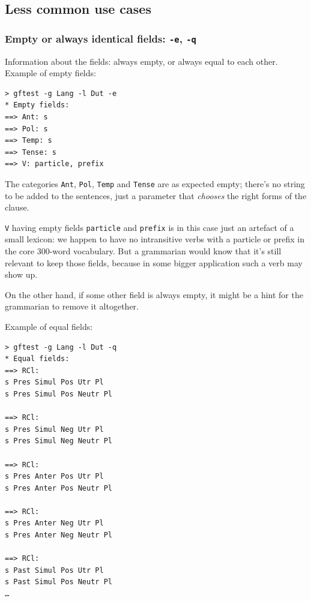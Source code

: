 \hypertarget{less-common-use-cases}{%
\subsection{Less common use cases}\label{less-common-use-cases}}

\hypertarget{empty-or-always-identical-fields--e--q}{%
\subsubsection{\texorpdfstring{Empty or always identical fields:
\texttt{-e},
\texttt{-q}}{Empty or always identical fields: -e, -q}}\label{empty-or-always-identical-fields--e--q}}

Information about the fields: always empty, or always equal to each
other. Example of empty fields:

\begin{verbatim}
> gftest -g Lang -l Dut -e
* Empty fields:
==> Ant: s
==> Pol: s
==> Temp: s
==> Tense: s
==> V: particle, prefix
\end{verbatim}

The categories \texttt{Ant}, \texttt{Pol}, \texttt{Temp} and
\texttt{Tense} are as expected empty; there's no string to be added to
the sentences, just a parameter that \emph{chooses} the right forms of
the clause.

\texttt{V} having empty fields \texttt{particle} and \texttt{prefix} is
in this case just an artefact of a small lexicon: we happen to have no
intransitive verbs with a particle or prefix in the core 300-word
vocabulary. But a grammarian would know that it's still relevant to keep
those fields, because in some bigger application such a verb may show
up.

On the other hand, if some other field is always empty, it might be a
hint for the grammarian to remove it altogether.

Example of equal fields:

\begin{verbatim}
> gftest -g Lang -l Dut -q
* Equal fields:
==> RCl:
s Pres Simul Pos Utr Pl
s Pres Simul Pos Neutr Pl

==> RCl:
s Pres Simul Neg Utr Pl
s Pres Simul Neg Neutr Pl

==> RCl:
s Pres Anter Pos Utr Pl
s Pres Anter Pos Neutr Pl

==> RCl:
s Pres Anter Neg Utr Pl
s Pres Anter Neg Neutr Pl

==> RCl:
s Past Simul Pos Utr Pl
s Past Simul Pos Neutr Pl
…
\end{verbatim}

